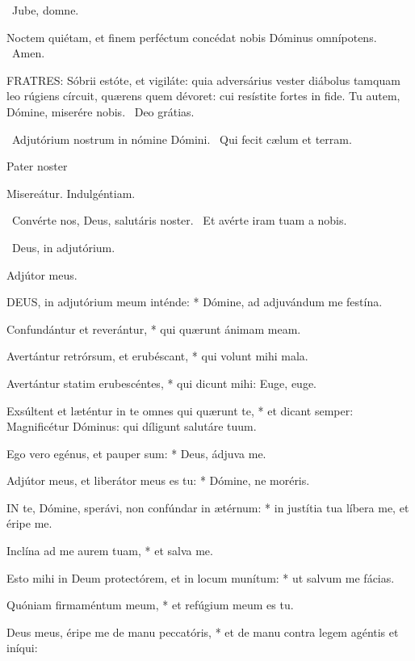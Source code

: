 
\V\ Jube, domne.

 Noctem quiétam, et finem perféctum concédat nobis Dóminus omnípotens. \R\ Amen.


\lettrine[lines=2]{F}{RATRES}: Sóbrii estóte, et vigiláte: quia adversárius vester diábolus tamquam leo rúgiens círcuit, quærens quem dévoret: cui resístite fortes in fide. Tu autem, Dómine, miserére nobis. \R\ Deo grátias.

\V\ Adjutórium nostrum in nómine Dómini. \R\ Qui fecit cælum et terram.

Pater noster 

 Misereátur. Indulgéntiam.

\V\ Convérte nos, Deus, salutáris noster. \R\ Et avérte iram tuam a nobis.

\V\ Deus, in adjutórium.

 Adjútor meus.


\lettrine[lines=2]{D}{EUS}, in adjutórium meum inténde: * Dómine, ad adjuvándum me festína.

Confundántur et reverántur, * qui quærunt ánimam meam.

Avertántur retrórsum, et erubéscant, * qui volunt mihi mala.

Avertántur statim erubescéntes, * qui dicunt mihi: Euge, euge.

Exsúltent et læténtur in te omnes qui quærunt te, * et dicant semper: Magnificétur Dóminus: qui díligunt salutáre tuum.

Ego vero egénus, et pauper sum: * Deus, ádjuva me.

Adjútor meus, et liberátor meus es tu: * Dómine, ne moréris.


\lettrine[lines=2]{I}{N} te, Dómine, sperávi, non confúndar in ætérnum: * in justítia tua líbera me, et éripe me.

Inclína ad me aurem tuam, * et salva me.

Esto mihi in Deum protectórem, et in locum munítum: * ut salvum me fácias.

Quóniam firmaméntum meum, * et refúgium meum es tu.

Deus meus, éripe me de manu peccatóris, * et de manu contra legem agéntis et iníqui:

